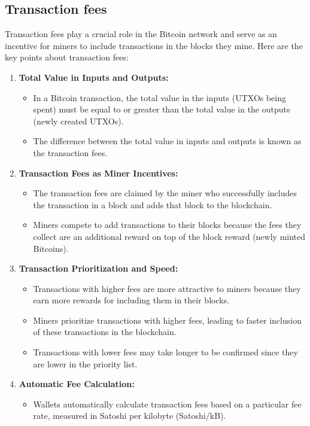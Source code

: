 \subsection{Transaction fees}
Transaction fees play a crucial role in the Bitcoin network and serve as an incentive for miners to include transactions in the blocks they mine. Here are the key points about transaction fees:
\begin{enumerate}
	\item \textbf{Total Value in Inputs and Outputs:} 
	\begin{itemize}
		\item In a Bitcoin transaction, the total value in the inputs (UTXOs being spent) must be equal to or greater than the total value in the outputs (newly created UTXOs).
		\item The difference between the total value in inputs and outputs is known as the transaction fees.
	\end{itemize}
	\item \textbf{Transaction Fees as Miner Incentives:}
	\begin{itemize}
		\item The transaction fees are claimed by the miner who successfully includes the transaction in a block and adds that block to the blockchain.
		\item Miners compete to add transactions to their blocks because the fees they collect are an additional reward on top of the block reward (newly minted Bitcoins).
	\end{itemize}
	\item \textbf{Transaction Prioritization and Speed:}
	\begin{itemize}
		\item Transactions with higher fees are more attractive to miners because they earn more rewards for including them in their blocks.
		\item Miners prioritize transactions with higher fees, leading to faster inclusion of these transactions in the blockchain.
		\item Transactions with lower fees may take longer to be confirmed since they are lower in the priority list.
	\end{itemize}
	\item \textbf{Automatic Fee Calculation:}
	\begin{itemize}
		\item Wallets automatically calculate transaction fees based on a particular fee rate, measured in Satoshi per kilobyte (Satoshi/kB).

\end{itemize}
\end{enumerate}
